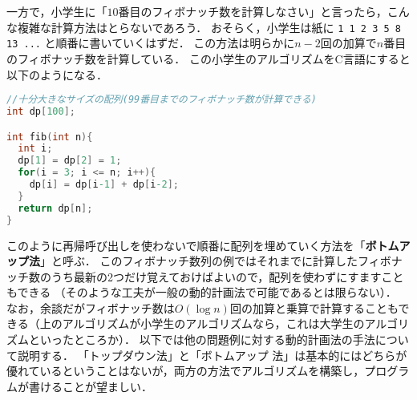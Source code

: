 \documentclass[a4paper,twoside,onecolumn,openany,article]{memoir}
\theoremstyle{remark}
\begin{document}
一方で，小学生に「$10$番目のフィボナッチ数を計算しなさい」と言ったら，こんな複雑な計算方法はとらないであろう．
おそらく，小学生は紙に \texttt{1  1  2  3 5 8 13 ...} と順番に書いていくはずだ．
この方法は明らかに$n-2$回の加算で$n$番目のフィボナッチ数を計算している．
この小学生のアルゴリズムをC言語にすると以下のようになる．
\begin{lstlisting}[basicstyle=\ttfamily\small,showstringspaces=false,language=C,frame=single]
//十分大きなサイズの配列(99番目までのフィボナッチ数が計算できる)
int dp[100];

int fib(int n){
  int i;
  dp[1] = dp[2] = 1;
  for(i = 3; i <= n; i++){
    dp[i] = dp[i-1] + dp[i-2];
  }
  return dp[n];
}
\end{lstlisting}
このように再帰呼び出しを使わないで順番に配列を埋めていく方法を「\textbf{ボトムアップ法}」と呼ぶ．
このフィボナッチ数列の例ではそれまでに計算したフィボナッチ数のうち最新の2つだけ覚えておけばよいので，配列を使わずにすますこともできる
（そのような工夫が一般の動的計画法で可能であるとは限らない）．
なお，余談だがフィボナッチ数は$O(\log n)$回の加算と乗算で計算することもできる（上のアルゴリズムが小学生のアルゴリズムなら，これは大学生のアルゴリズムといったところか）．
以下では他の問題例に対する動的計画法の手法について説明する．
「トップダウン法」と「ボトムアップ 法」は基本的にはどちらが優れているということはないが，両方の方法でアルゴリズムを構築し，プログラムが書けることが望ましい．
\end{document}
